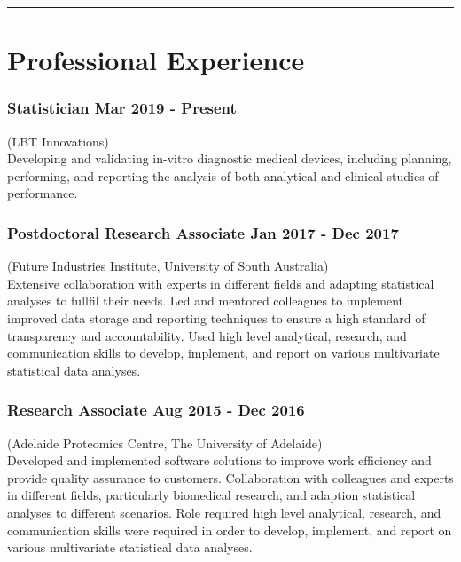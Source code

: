 \documentclass[a4paper,12pt]{report}
\begin{document}
\vspace{0.4cm}
\hrule

\vspace{1cm}
\section*{Professional Experience}

\subsubsection*{Statistician  \hfill Mar 2019 - Present} \vspace{-6pt}
(LBT Innovations) \\[4pt]

Developing and validating in-vitro diagnostic medical devices, including planning, performing, 
and reporting the analysis of both analytical and clinical studies of performance.

\subsubsection*{Postdoctoral Research Associate  \hfill Jan 2017 - Dec 2017} \vspace{-6pt}
(Future Industries Institute, University of South Australia) \\[4pt]

Extensive collaboration with experts in different fields and adapting statistical
analyses to fullfil their needs. Led and mentored colleagues to implement
improved data storage and reporting techniques to ensure a high standard of transparency
and accountability. Used high level analytical, research, and communication skills to develop, 
implement, and report on various multivariate statistical data analyses.

\subsubsection*{Research Associate  \hfill Aug 2015 - Dec 2016} \vspace{-6pt}
(Adelaide Proteomics Centre, The University of Adelaide) \\[4pt]

Developed and implemented software solutions to improve work efficiency
and provide quality assurance to customers. Collaboration with colleagues and experts
in different fields, particularly biomedical research, and adaption statistical analyses to
different scenarios. Role required high level analytical, research, and communication skills
were required in order to develop, implement, and report on various multivariate statistical
data analyses.
\end{document}
